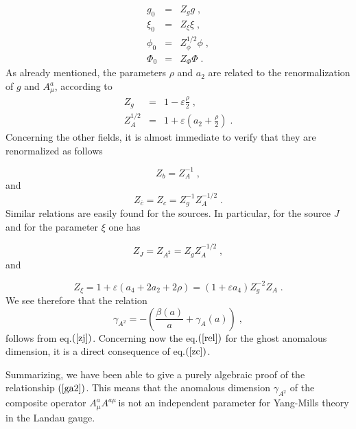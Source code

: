 \documentclass[a4paper,12pt]{article}
\begin{document}
\begin{eqnarray}
g_{0} &=&Z_{g}g\;,  \label{z} \\
\xi _{0} &=&Z_{\xi }\xi \;,  \nonumber \\
\phi _{0} &=&Z_{\phi }^{1/2}\phi \;,  \nonumber \\
\Phi _{0} &=&Z_{\Phi }\Phi \;.  \nonumber
\end{eqnarray}
As already mentioned, the parameters $\rho $ and $a_{2}$ are related to the
renormalization of $g$ and $A_{\mu }^{a}$, according to 
\begin{eqnarray}
Z_{g} &=&1-\varepsilon \frac{\rho }{2}\;,  \label{zgza} \\
Z_{A}^{1/2} &=&1+\varepsilon \left( a_{2}+\frac{\rho }{2}\right) \;. 
\nonumber
\end{eqnarray}
Concerning the other fields, it is almost immediate to verify that they are
renormalized as follows

\begin{equation}
Z_{b}=Z_{A}^{-1}\;,  \label{zb}
\end{equation}
and 
\begin{equation}
Z_{\overline{c}}=Z_{c}=Z_{g}^{-1}Z_{A}^{-1/2}\;.  \label{zc}
\end{equation}
Similar relations are easily found for the sources. In particular, for the
source $J$ and for the parameter $\xi $ one has

\begin{equation}
Z_{J}=Z_{A^{2}}=Z_{g}Z_{A}^{-1/2}\;,  \label{zj}
\end{equation}
and

\begin{equation}
Z_{\xi }=1+\varepsilon \left( a_{4}+2a_{2}+2\rho \right) =\left(
1+\varepsilon a_{4}\right) Z_{g}^{-2}Z_{A}\;.  \label{zx}
\end{equation}
We see therefore that the relation 
\begin{equation}
\gamma _{A^{2}}=-\left( \frac{\beta (a)}{a}+\gamma _{A}(a)\right) \;,
\label{frel}
\end{equation}
follows from eq.$\left( \ref{zj}\right) $. Concerning now the eq.$\left( \ref
{rel}\right) $ for the ghost anomalous dimension, it is a direct consequence
of eq.$\left( \ref{zc}\right) $.

Summarizing, we have been able to give a purely algebraic proof of the
relationship $\left( \ref{ga2}\right) $. This means that the anomalous
dimension $\gamma _{A^{2}}$ of the composite operator $A_{\mu }^{a}A^{a\mu
\;}$is not an independent parameter for Yang-Mills theory in the Landau
gauge.
\end{document}
